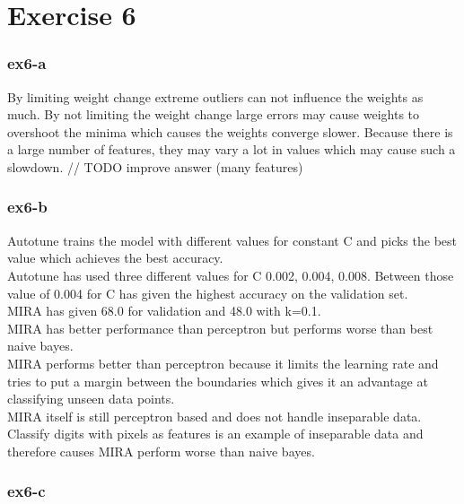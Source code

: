 \section{Exercise 6}
\subsubsection{ex6-a}
By limiting weight change extreme outliers can not influence the weights as much. By not limiting the weight change
large errors may cause weights to overshoot the minima which causes the weights converge slower. Because there is a large
number of features, they may vary a lot in values which may cause such a slowdown.
// TODO improve answer (many features)

\subsubsection{ex6-b}
Autotune trains the model with different values for constant C and picks the best value which achieves the best
accuracy.\\
Autotune has used three different values for C {0.002, 0.004, 0.008}. Between those value of 0.004 for C has given the
highest accuracy on the validation set. \\
MIRA has given 68.0%
for validation and 48.0%
with k=0.1.\\
MIRA has better performance than perceptron but performs worse than best naive bayes. \\
MIRA performs better than perceptron because it limits the learning rate and tries to put a margin between the
boundaries which gives it an advantage at classifying unseen data points. \\
MIRA itself is still perceptron based and does not handle inseparable data. Classify digits with pixels as features is
an example of inseparable data and therefore causes MIRA perform worse than naive bayes.

\subsubsection{ex6-c}
